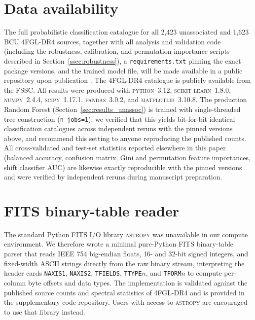 \documentclass[fleqn,12pt]{article}
\newcommand{\fgl}{4FGL-DR4}
\begin{document}
\section*{Data availability}
The full probabilistic classification catalogue for all 2,423
unassociated and 1,623 BCU \fgl{} sources, together with all analysis
and validation code (including the robustness, calibration, and
permutation-importance scripts described in
Section~\ref{ssec:robustness}), a \texttt{requirements.txt} pinning
the exact package versions, and the trained model file, will be made
available in a public repository upon publication \citep{code2025}.
The \fgl{} catalogue is publicly available from the FSSC. All results were
produced with \textsc{python}~3.12, \textsc{scikit-learn}~1.8.0,
\textsc{numpy}~2.4.4, \textsc{scipy}~1.17.1, \textsc{pandas}~3.0.2,
and \textsc{matplotlib}~3.10.8. The production Random Forest
(Section~\ref{sec:results_unassoc}) is trained with single-threaded
tree construction (\texttt{n\_jobs=1}); we verified that this yields
bit-for-bit identical classification catalogues across independent
reruns with the pinned versions above, and recommend this setting to
anyone reproducing the published counts. All cross-validated and
test-set statistics reported elsewhere in this paper (balanced
accuracy, confusion matrix, Gini and permutation feature importances,
shift classifier AUC) are likewise exactly reproducible with the
pinned versions and were verified by independent reruns during
manuscript preparation.

\appendix

\section{FITS binary-table reader}
\label{app:fits}

The standard Python FITS I/O library \textsc{astropy} was unavailable
in our compute environment. We therefore wrote a minimal pure-Python
FITS binary-table parser that reads IEEE 754 big-endian floats,
16- and 32-bit signed integers, and fixed-width ASCII strings directly
from the raw binary stream, interpreting the header cards
\texttt{NAXIS1}, \texttt{NAXIS2}, \texttt{TFIELDS}, \texttt{TTYPE$n$},
and \texttt{TFORM$n$} to compute per-column byte offsets and data types.
The implementation is validated against the published source counts and
spectral statistics of \fgl{} and is provided in the supplementary
code repository. Users with access to \textsc{astropy} are encouraged
to use that library instead.
\end{document}
